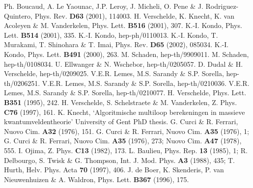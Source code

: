 \documentclass[a4paper,11pt]{article}
\begin{document}
\begin{thebibliography}{99} 
 Ph. Boucaud, A. Le Yaounac, J.P. Leroy, J. Micheli, O. Pene \&
J. Rodriguez-Quintero, Phys. Rev. {\bf D63} (2001), 114003. 
 H. Verschelde, K. Knecht, K. van Acoleyen \& M. Vanderkelen, 
Phys. Lett. {\bf B516} (2001), 307. 
 K.-I. Kondo, Phys. Lett. {\bf B514} (2001), 335.  
 K.-I. Kondo, hep-ph/0110013. 
 K.-I. Kondo, T. Murakami, T. Shinohara \& T. Imai, Phys. Rev. 
{\bf D65} (2002), 085034.  
 K.-I. Kondo, Phys. Lett. {\bf B491} (2000), 263.  
 M. Schaden, hep-th/9909011. 
 M. Schaden, hep-th/0108034. 
 U. Ellwanger \& N. Wschebor, hep-th/0205057. 
 D. Dudal \& H. Verschelde, hep-th/0209025.  
 V.E.R. Lemes, M.S. Sarandy \& S.P. Sorella, hep-th/0206251. 
 V.E.R. Lemes, M.S. Sarandy \& S.P. Sorella, hep-th/0210036. 
 V.E.R. Lemes, M.S. Sarandy \& S.P. Sorella, hep-th/0210077. 
 H. Verschelde, Phys. Lett. {\bf B351} (1995), 242. 
 H. Verschelde, S. Schelstraete \& M. Vanderkelen, Z. Phys. {\bf
C76} (1997), 161. 
 K. Knecht, `Algoritmische multiloop berekeningen in massieve
kwantumveldentheorie' University of Gent PhD thesis. 
 G. Curci \& R. Ferrari, Nuovo Cim. {\bf A32} (1976), 151. 
 G. Curci \& R. Ferrari, Nuovo Cim. {\bf A35} (1976), 1; 
G. Curci \& R. Ferrari, Nuovo Cim. {\bf A35} (1976), 273; 
Nuovo Cim. {\bf A47} (1978), 555. 
 I. Ojima, Z. Phys. {\bf C13} (1982), 173.  
 L. Baulieu, Phys. Rep. {\bf 13} (1985), 1; 
R. Delbourgo, S. Twisk \& G. Thompson, Int. J. Mod. Phys. {\bf A3} (1988), 435;
T. Hurth, Helv. Phys. Acta {\bf 70} (1997), 406. 
 J. de Boer, K. Skenderis, P. van Nieuwenhuizen \& A. Waldron, Phys.
Lett. {\bf B367} (1996), 175. 

\end{thebibliography}
\end{document}
